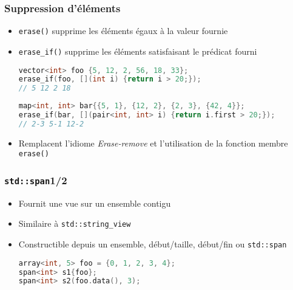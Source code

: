 \documentclass[C++.tex]{subfiles}
\begin{document}
\begin{frame}[fragile]
	\frametitle{Suppression d'éléments}
	\begin{itemize}
		\item \lstinline|erase()| supprime les éléments égaux à la valeur fournie
		\item \lstinline|erase_if()| supprime les éléments satisfaisant le prédicat fourni

		\begin{lstlisting}[language=C++]
vector<int> foo {5, 12, 2, 56, 18, 33};
erase_if(foo, [](int i) {return i > 20;});
// 5 12 2 18\end{lstlisting}

		\begin{lstlisting}[language=C++]
map<int, int> bar{{5, 1}, {12, 2}, {2, 3}, {42, 4}};
erase_if(bar, [](pair<int, int> i) {return i.first > 20;});
// 2-3 5-1 12-2 \end{lstlisting}

		\item Remplacent l'idiome \og \textit{Erase-remove}\fg{} et l'utilisation de la fonction membre \lstinline|erase()|
	\end{itemize}
\end{frame}

\begin{frame}[fragile]
	\frametitle{\lstinline|std::span|\titlehfill{}1/2}
	\begin{itemize}
		\item Fournit une vue sur un ensemble contigu


		\item Similaire à \lstinline|std::string_view|
		\item Constructible depuis un ensemble, début/taille, début/fin ou \lstinline|std::span|

	\begin{lstlisting}[language=C++]
array<int, 5> foo = {0, 1, 2, 3, 4};
span<int> s1{foo};
span<int> s2(foo.data(), 3);\end{lstlisting}
	\end{itemize}
\end{frame}
\end{document}
